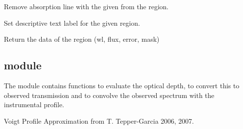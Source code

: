 \documentclass[letterpaper,10pt,english]{sphinxmanual}
\begin{document}
\begin{fulllineitems}
\begin{fulllineitems}
\end{fulllineitems}


\begin{fulllineitems}
\label{\detokenize{api:regions.Region.remove_line}}
Remove absorption line with the given  from the region.

\end{fulllineitems}


\begin{fulllineitems}
\label{\detokenize{api:regions.Region.set_label}}
Set descriptive text label for the given region.

\end{fulllineitems}


\begin{fulllineitems}
\label{\detokenize{api:regions.Region.unpack}}
Return the data of the region (wl, flux, error, mask)

\end{fulllineitems}


\end{fulllineitems}



\subsection{module }
\label{\detokenize{api:module-voigt}}
The module contains functions to evaluate the optical depth,
to convert this to observed transmission and to convolve the
observed spectrum with the instrumental profile.

\begin{fulllineitems}
\label{\detokenize{api:voigt.H}}
Voigt Profile Approximation from T. Tepper-Garcia 2006, 2007.

\end{fulllineitems}
\end{document}
